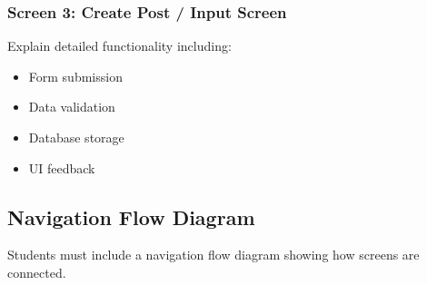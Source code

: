 

\subsubsection{Screen 3: Create Post / Input Screen}

Explain detailed functionality including:
\begin{itemize}
    \item Form submission
    \item Data validation
    \item Database storage
    \item UI feedback
\end{itemize}





\subsection{Navigation Flow Diagram}

Students must include a navigation flow diagram showing how screens 
are connected.




